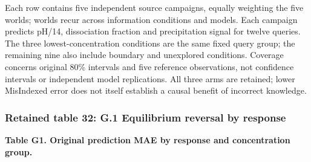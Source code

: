 \documentclass[10pt,a4paper]{article}
\begin{document}
Each row contains five independent source campaigns, equally weighting the five worlds; worlds recur across information conditions and models. Each campaign predicts pH/14, dissociation fraction and precipitation signal for twelve queries. The three lowest-concentration conditions are the same fixed query group; the remaining nine also include boundary and unexplored conditions. Coverage concerns original 80\% intervals and five reference observations, not confidence intervals or independent model replications. All three arms are retained; lower MisIndexed error does not itself establish a causal benefit of incorrect knowledge.

\subsubsection{Retained table 32: G.1 Equilibrium reversal by response}\label{retained-table-32-g.1-equilibrium-reversal-by-response}

\textbf{Table G1. Original prediction MAE by response and concentration group.}
\end{document}
